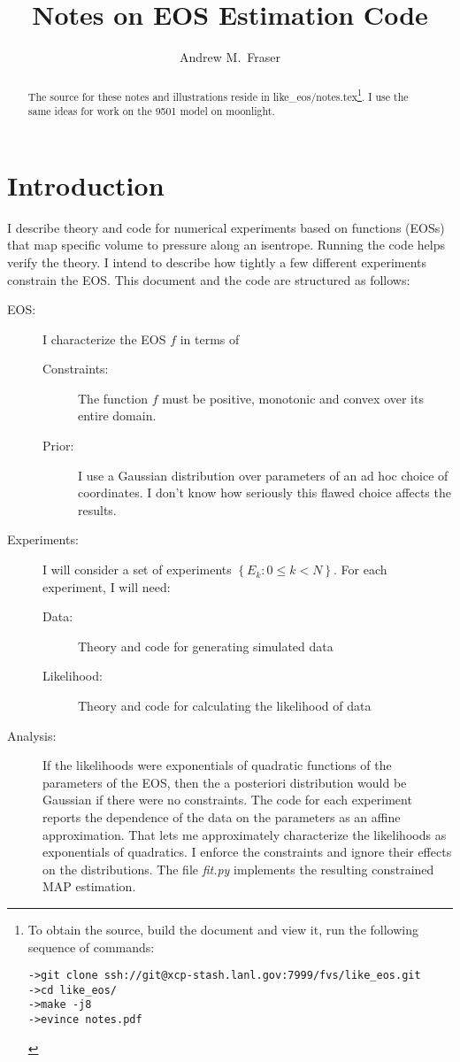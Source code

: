 \documentclass[11pt]{article}
\title{Notes on EOS Estimation Code}
\author{Andrew M.\ Fraser}
\begin{document}
\maketitle
\begin{abstract}
  The source for these notes and illustrations reside in
  like\_eos/notes.tex\footnote{To obtain the source, build the
    document and view it, run the following sequence of commands:
\begin{verbatim}
->git clone ssh://git@xcp-stash.lanl.gov:7999/fvs/like_eos.git
->cd like_eos/
->make -j8
->evince notes.pdf 
\end{verbatim}
}.
  I use the same ideas for work on the 9501 model on moonlight.
\end{abstract}

\section{Introduction}
\label{sec:introduction}

I describe theory and code for numerical experiments based on functions
(EOSs) that map specific volume to pressure along an isentrope.
Running the code helps verify the theory.  I intend to describe how
tightly a few different experiments constrain the EOS.  This document
and the code are structured as follows:
\begin{description}
\item[EOS:] I characterize the EOS $f$ in terms of
  \begin{description}
  \item[Constraints:] The function $f$ must be positive, monotonic and
    convex over its entire domain.
  \item[Prior:] I use a Gaussian distribution over parameters of an ad
    hoc choice of coordinates.  I don't know how seriously this flawed
    choice affects the results.
  \end{description}
\item[Experiments:] I will consider a set of experiments
  $\left\{ E_k: 0 \leq k < N \right\}$.  For each experiment, I will
  need:
  \begin{description}
  \item[Data:] Theory and code for generating simulated data
  \item[Likelihood:] Theory and code for calculating the likelihood of
    data
  \end{description}
\item[Analysis:] If the likelihoods were exponentials of quadratic
  functions of the parameters of the EOS, then the a posteriori
  distribution would be Gaussian if there were no constraints.  The
  code for each experiment reports the dependence of the data on the
  parameters as an affine approximation.  That lets me approximately
  characterize the likelihoods as exponentials of quadratics.  I
  enforce the constraints and ignore their effects on the
  distributions.  The file \emph{fit.py} implements the resulting
  constrained MAP estimation.
\end{description}
\end{document}
